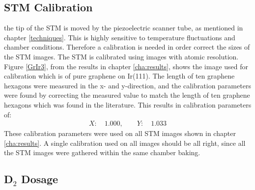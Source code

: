 \subsection{STM Calibration}
the tip of the STM is moved by the piezoelectric scanner tube, as mentioned in chapter \ref{techniques}. This is highly sensitive to temperature fluctuations and chamber conditions. Therefore a calibration is needed in order correct the sizes of the STM images. The STM is calibrated using images with atomic resolution. Figure \ref{GrIr3}, from the results in chapter \ref{cha:results}, shows the image used for calibration which is of pure graphene on Ir(111). The length of ten graphene hexagons were measured in the x- and y-direction, and the calibration parameters were found by correcting the measured value to match the length of ten graphene hexagons which was found in the literature. This results in calibration parameters of:
\begin{align}
X: \quad 1.000, \qquad Y: \quad 1.033
\end{align}
These calibration parameters were used on all STM images shown in chapter \ref{cha:results}. A single calibration used on all images should be all right, since all the STM images were gathered within the same chamber baking.

\subsection{D$_2$ Dosage}

